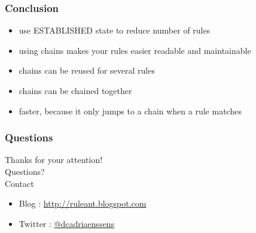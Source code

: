 \documentclass[14pt]{beamer}
\begin{document}
  \begin{frame}
    \frametitle{Conclusion}
    \begin{itemize}
      \item use ESTABLISHED state to reduce number of rules
      \item using chains makes your rules easier readable and maintainable
      \item chains can be reused for several rules
      \item chains can be chained together
      \item faster, because it only jumps to a chain when a rule matches
    \end{itemize}
  \end{frame}
  \begin{frame}
   \frametitle{Questions}
    Thanks for your attention!\\
    Questions?\\
    Contact
    \begin{itemize}
      \item Blog : \href{http://ruleant.blogspot.com/}{http://ruleant.blogspot.com}
      \item Twitter : \href{https://twitter.com/dcadriaenssens}{@dcadriaenssens}
    \end{itemize}
  \end{frame}
\end{document}
